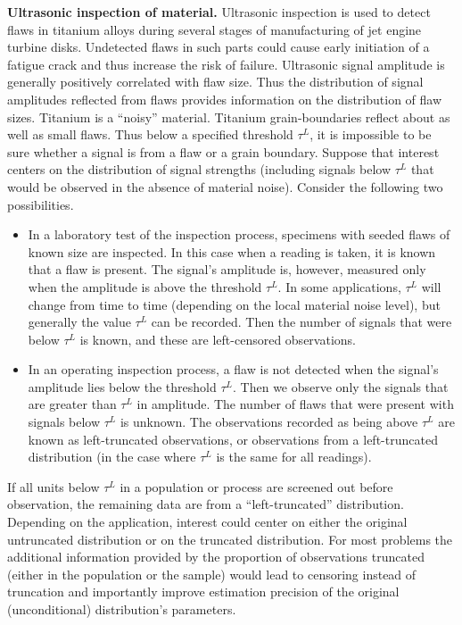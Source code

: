 \begin{example}
\label{example:ut.trun}
{\bf Ultrasonic inspection of material.} Ultrasonic inspection is
used to detect flaws in titanium alloys during several stages of
manufacturing of jet engine turbine disks.  Undetected flaws in such
parts could cause early initiation of a fatigue crack and thus
increase the risk of failure.  Ultrasonic signal amplitude is
generally positively correlated with flaw size. Thus the
distribution of signal amplitudes reflected from flaws provides
information on the distribution of flaw sizes. Titanium is a
``noisy'' material.  Titanium grain-boundaries reflect about as well
as small flaws.  Thus below a specified threshold $\tau^{L}$, it is
impossible to be sure whether a signal is from a flaw or a grain
boundary.  Suppose that interest centers on the distribution of
signal strengths (including signals below $\tau^{L}$ that would be
observed in the absence of material noise). Consider the following
two possibilities.

\begin{itemize}
\item
In a laboratory test of the inspection process, specimens with
seeded flaws of known size are inspected. In this case when a
reading is taken, it is known that a flaw is present. The signal's
amplitude is, however, measured only when the amplitude is above the
threshold $\tau^{L}$.  In some applications, $\tau^{L}$ will change
from time to time (depending on the local material noise level), but
generally the value $\tau^{L}$ can be recorded. Then the number of
signals that were below $\tau^{L}$ is known, and these are
left-censored observations.
\item
In an operating inspection process, a flaw is not detected when the
signal's amplitude lies below the threshold $\tau^{L}$. Then we
observe only the signals that are greater than $\tau^{L}$ in
amplitude. The number of flaws that were present with signals below
$\tau^{L}$ is unknown.  The observations recorded as being above
$\tau^{L}$ are known as left-truncated observations, or observations
from a left-truncated distribution (in the case where $\tau^{L}$ is
the same for all readings).
\end{itemize}
\end{example}


If all units below $\tau^{L}$ in a population or process are screened
out before observation, the remaining data are from a
``left-truncated'' distribution.  Depending on the application,
interest could center on either the original untruncated distribution
or on the truncated distribution.  For most problems the additional
information provided by the proportion of observations truncated
(either in the population or the sample) would lead to censoring
instead of truncation and importantly improve estimation precision of
the original (unconditional) distribution's parameters.



